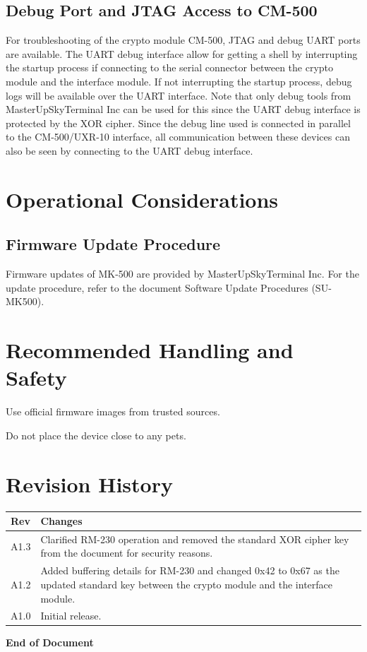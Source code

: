 \documentclass[11pt,a4paper,twocolumn]{article}
\begin{document}
\subsection{Debug Port and JTAG Access to CM-500} For troubleshooting of the crypto module CM-500, JTAG and debug UART ports are available. The UART debug interface allow for getting a shell by interrupting the startup process if connecting to the serial connector between the crypto module and the interface module. If not interrupting the startup process, debug logs will be available over the UART interface. Note that only debug tools from MasterUpSkyTerminal Inc can be used for this since the UART debug interface is protected by the XOR cipher. Since the debug line used is connected in parallel to the CM-500/UXR-10 interface, all communication between these devices can also be seen by connecting to the UART debug interface.

\section{Operational Considerations}
\subsection{Firmware Update Procedure}
Firmware updates of MK-500 are provided by MasterUpSkyTerminal Inc. For the update procedure, refer to the document Software Update Procedures (SU-MK500). 

\section{Recommended Handling and Safety}
\begin{compactitem}
\item Use official firmware images from trusted sources.
\item Do not place the device close to any pets. 
\end{compactitem}

\section{Revision History}
\begin{tabularx}{\linewidth}{lX}
\textbf{Rev} &
\textbf{Changes}
\\
\hline A1.3 & Clarified RM-230 operation and removed the standard XOR cipher key from the document for security reasons.
\\ A1.2 & Added buffering details for RM-230 and changed 0x42 to 0x67 as the updated standard key between the crypto module and the interface module.
\\ A1.0 & Initial release.
\\
\end{tabularx}
\vfill
\noindent
\textbf{End of Document}
\end{document}
